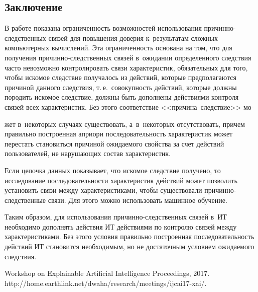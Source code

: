 \begin{multicols}{2}
\vspace*{-4pt}
  
  \section{Заключение }
  
  В работе показана ограниченность возможностей использования при\-чин\-но-след\-ст\-вен\-ных 
  связей для повышения доверия к~результатам сложных 
компьютерных вычислений. Эта ограниченность основана на том, что для 
получения при\-чин\-но-след\-ст\-вен\-ных связей в~ожидании определенного 
следствия часто невозможно контролировать связи характеристик, обязательных 
для того, чтобы искомое следствие получалось из действий, которые 
предполагаются причиной данного следствия, т.\,е.\ совокупность действий, 
которые должны породить искомое следствие, должны быть дополнены 
действиями контроля связей всех характеристик. Без этого соответствие  
<<при\-чи\-на--след\-ст\-вие>> мо-\linebreak\vspace*{-12pt}

\pagebreak


\noindent
жет в~некоторых случаях существовать, 
а~в~некоторых отсутствовать, причем правильно построенная априори 
последовательность характеристик может перестать становиться причиной 
ожидаемого свойства за счет действий пользователей, не на\-ру\-ша\-ющих со\-став 
характеристик.
  
  Если цепочка данных показывает, что искомое следствие получено, то 
исследование последовательности характеристик действий может позволить 
установить связи между \mbox{характеристиками}, чтобы существовали  
при\-чин\-но-след\-ст\-вен\-ные связи. Для этого можно использовать машинное 
обуче\-ние.
  
  Таким образом, для использования при\-чин\-но-след\-ст\-вен\-ных связей в~ИТ 
необходимо дополнять действия ИТ действиями по контролю связей между 
характеристиками. Без этого условия правильно построенная последовательность 
действий ИТ становится необходимым, но не достаточным условием ожидаемого 
следствия. 
  
{\small\frenchspacing
 {%
 \begin{thebibliography}{99}

 Workshop on Explainable Artificial Intelligence Proceedings, 2017.
 {\sf  
http://home.earthlink.net/dwaha/research/\linebreak meetings/ijcai17-xai/}.


\end{thebibliography}}}
\end{multicols}
